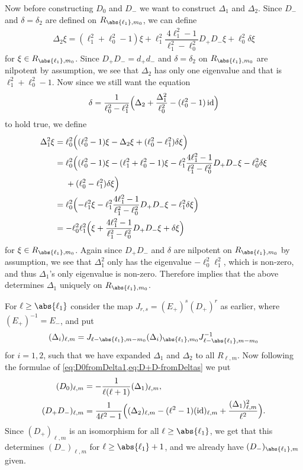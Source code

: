 Now before constructing $D_0$ and $D_-$ we want to construct $\Delta_1$ and $\Delta_2$. Since $D_-$ and $\delta=\delta_2$ are defined on $R_{\abs{\ell_1},m_0}$, we can define
\begin{align*}
  \Delta_2\xi = (\ell_1^2+\ell_0^2-1)\xi + \ell_1^2\dfrac{4\ell_1^2-1}{\ell_1^2-\ell_0^2} D_+D_-\xi + \ell_0^2\delta\xi
\end{align*}
for $\xi \in R_{\abs{\ell_1},m_0}$. Since $D_+D_-=d_+d_-$ and $\delta=\delta_2$ on $R_{\abs{\ell_1},m_0}$ are nilpotent by assumption, we see that $\Delta_2$ has only one eigenvalue and that is $\ell_1^2+\ell_0^2-1$. Now since we still want the equation
\begin{align*}
  \delta = \dfrac{1}{\ell_0^2-\ell_1^2}\Bigl( \Delta_2 + \dfrac{\Delta_1^2}{\ell_0^2} - (\ell_0^2-1)\operatorname{id} \Bigr)
\end{align*}
to hold true, we define
\begin{align*}
  \Delta_1^2\xi &= \ell_0^2\Bigl( (\ell_0^2-1)\xi - \Delta_2\xi + (\ell_0^2-\ell_1^2)\delta\xi   \Bigr) \\
         &= \ell_0^2\Bigl( (\ell_0^2-1)\xi - (\ell_1^2+\ell_0^2-1)\xi - \ell_1^2\dfrac{4\ell_1^2-1}{\ell_1^2-\ell_0^2} D_+D_- \xi - \ell_0^2\delta \xi \\*
         &\phantom{{}={}}{} + (\ell_0^2-\ell_1^2)\delta\xi   \Bigr) \\
         &= \ell_0^2\Bigl( -\ell_1^2 \xi - \ell_1^2\dfrac{4\ell_1^2-1}{\ell_1^2-\ell_0^2} D_+D_- \xi - \ell_1^2\delta\xi \Bigr)\\
         &= -\ell_0^2\ell_1^2\Bigl( \xi + \dfrac{4\ell_1^2-1}{\ell_1^2-\ell_0^2} D_+D_- \xi + \delta\xi \Bigr)
\end{align*}
for $\xi \in R_{\abs{\ell_1},m_0}$. Again since $D_+D_-$ and $\delta$ are nilpotent on $R_{\abs{\ell_1},m_0}$ by assumption, we see that $\Delta_1^2$ only has the eigenvalue $-\ell_0^2\ell_1^2$, which is non-zero, and thus $\Delta_1$'s only eigenvalue is non-zero. Therefore  implies that the above determines $\Delta_1$ uniquely on $R_{\abs{\ell_1},m_0}$.

For $\ell\geq \abs{\ell_1}$ consider the map $J_{r,s}=(E_+)^s(D_+)^r$ as earlier, where $(E_+)^{-1}=E_-$, and put 
\begin{align*}
  (\Delta_i)_{\ell,m} = J_{\ell-\abs{\ell_1},m-m_0}(\Delta_i)_{\abs{\ell_1},m_0}J_{\ell-\abs{\ell_1},m-m_0}^{-1}
\end{align*}
for $i=1,2$, such that we have expanded $\Delta_1$ and $\Delta_2$ to all $R_{\ell,m}$. Now following the formulae of \cref{eq:D0fromDelta1,eq:D+D-fromDeltas} we put
\begin{align*}
  (D_0)_{\ell,m} &= - \dfrac{1}{\ell(\ell+1)}(\Delta_1)_{\ell,m},\\
  (D_+D_-)_{\ell,m} &= \dfrac{1}{4\ell^2-1}\Bigl((\Delta_2)_{\ell,m} - (\ell^2-1)(\operatorname{id})_{\ell,m} + \dfrac{(\Delta_1)_{\ell,m}^2}{\ell^2} \Bigr).
\end{align*}
Since $(D_+)_{\ell,m}$ is an isomorphism for all $\ell\geq \abs{\ell_1}$, we get that this determines $(D_-)_{\ell,m}$ for $\ell\geq \abs{\ell_1}+1$, and we already have $(D_-)_{\abs{\ell_1},m}$ given.

